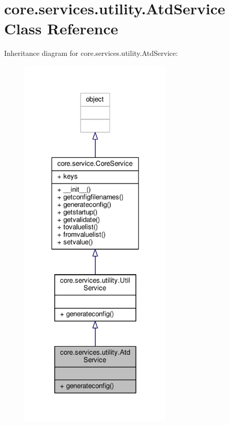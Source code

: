 \hypertarget{classcore_1_1services_1_1utility_1_1_atd_service}{\section{core.\+services.\+utility.\+Atd\+Service Class Reference}
\label{classcore_1_1services_1_1utility_1_1_atd_service}
}


Inheritance diagram for core.\+services.\+utility.\+Atd\+Service\+:
\nopagebreak
\begin{figure}[H]
\begin{center}
\leavevmode
\includegraphics[width=207pt]{classcore_1_1services_1_1utility_1_1_atd_service__inherit__graph}
\end{center}
\end{figure}


